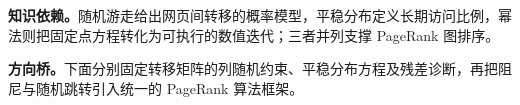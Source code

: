 \documentclass[UTF8,a4paper,11pt,openany]{ctexbook}
\begin{document}
\setcounter{page}{896}
\setcounter{chapter}{36}
\setcounter{section}{0}
\setcounter{figure}{0}
\pagestyle{headings}
\textbf{知识依赖。}随机游走给出网页间转移的概率模型，平稳分布定义长期访问比例，幂法则把固定点方程转化为可执行的数值迭代；三者并列支撑 PageRank 图排序。

\FloatBarrier
\textbf{方向桥。}下面分别固定转移矩阵的列随机约束、平稳分布方程及残差诊断，再把阻尼与随机跳转引入统一的 PageRank 算法框架。
\end{document}
